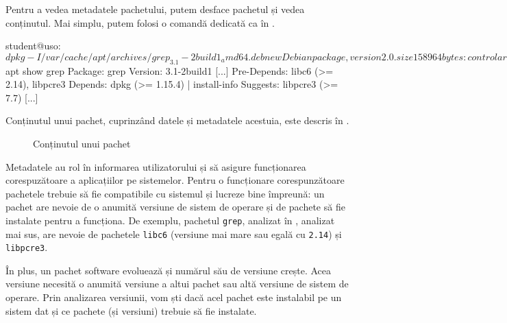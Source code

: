 
Pentru a vedea metadatele pachetului, putem desface pachetul și vedea conținutul. Mai simplu, putem folosi o comandă dedicată ca în .

\begin{screen}[caption={Metadatele unui pachet Debian (.deb)},label={lst:package:metadata}]
student@uso:~$ dpkg -I /var/cache/apt/archives/grep_3.1-2build1_amd64.deb
 new Debian package, version 2.0.
 size 158964 bytes: control archive=1416 bytes.
    1219 bytes,    29 lines      control
     746 bytes,    13 lines      md5sums
 Package: grep
 Version: 3.1-2build1
 Architecture: amd64
 [...]
 Pre-Depends: libc6 (>= 2.14), libpcre3
 Depends: dpkg (>= 1.15.4) | install-info
 Suggests: libpcre3 (>= 7.7)
 [..]

student@uso:~$ apt show grep
Package: grep
Version: 3.1-2build1
[...]
Pre-Depends: libc6 (>= 2.14), libpcre3
Depends: dpkg (>= 1.15.4) | install-info
Suggests: libpcre3 (>= 7.7)
[...]
\end{screen}

Conținutul unui pachet, cuprinzând datele și metadatele acestuia, este descris în .

\begin{figure}[htbp]
  \centering
  \def\svgwidth{0.8\columnwidth}
  
  \caption{Conținutul unui pachet}
  \label{fig:package:content}
\end{figure}

Metadatele au rol în informarea utilizatorului și să asigure funcționarea corespuzătoare a aplicațiilor pe sistemelor. Pentru o funcționare corespunzătoare pachetele trebuie să fie compatibile cu sistemul și lucreze bine împreună: un pachet are nevoie de o anumită versiune de sistem de operare și de pachete să fie instalate pentru a funcționa. De exemplu, pachetul \texttt{grep}, analizat în , analizat mai sus, are nevoie de pachetele \texttt{libc6} (versiune mai mare sau egală cu \texttt{2.14}) și \texttt{libpcre3}.

În plus, un pachet software evoluează și numărul său de versiune crește. Acea versiune necesită o anumită versiune a altui pachet sau altă versiune de sistem de operare. Prin analizarea versiunii, vom ști dacă acel pachet este instalabil pe un sistem dat și ce pachete (și versiuni) trebuie să fie instalate.

